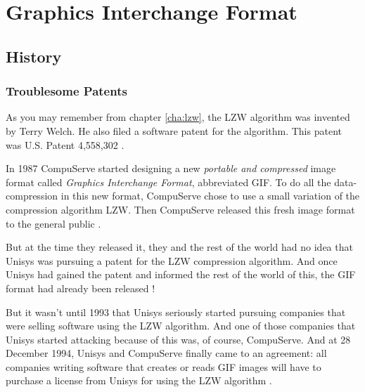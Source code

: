 \begin{comment}
  
\end{comment}

\chapter{Graphics Interchange Format}
\label{cha:gif}

\begin{refsection}

  \section{History}


  \subsection{Troublesome Patents}

  As you may remember from chapter \ref{cha:lzw}, the LZW algorithm
  was invented by Terry Welch. He also filed a software patent for the
  algorithm. This patent was U.S. Patent 4,558,302
  \cite{welch85:_u,roelofs09:_histor_portab_networ_graph_png_format}.

  \newcommand{\compus}{CompuServe\xspace}

  In 1987 \compus started designing a new \textit{portable and
    compressed} image format called \textit{Graphics Interchange
    Format}, abbreviated GIF. To do all the data-compression in this
  new format, \compus chose to use a small variation of the
  compression algorithm LZW. Then \compus released this fresh image
  format to the general public
  \cite{roelofs09:_histor_portab_networ_graph_png_format}.

  But at the time they released it, they and the rest of the world had
  no idea that Unisys was pursuing a patent for the LZW compression
  algorithm. And once Unisys had gained the patent and informed the
  rest of the world of this, the GIF format had already been released
  \cite{roelofs09:_histor_portab_networ_graph_png_format}!

  But it wasn't until 1993 that Unisys seriously started pursuing
  companies that were selling software using the LZW algorithm. And
  one of those companies that Unisys started attacking because of this
  was, of course, \compus. And at 28 December 1994, Unisys and \compus
  finally came to an agreement: all companies writing software that
  creates or reads GIF images will have to purchase a license from
  Unisys for using the LZW algorithm
  \cite{roelofs09:_histor_portab_networ_graph_png_format,caie:_sad}.


\end{refsection}
